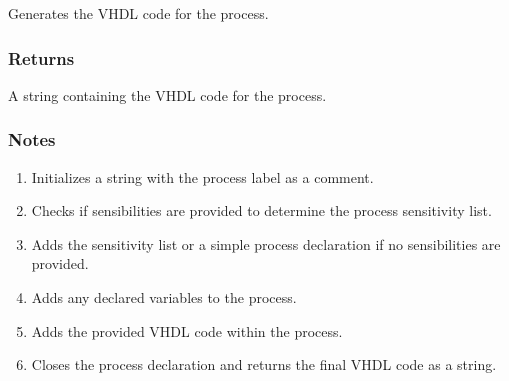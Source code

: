 \documentclass[letterpaper,10pt,english]{sphinxmanual}
\begin{document}
\begin{fulllineitems}
\begin{fulllineitems}
\label{\detokenize{process:process.Process.process_to_vhdl}}
\pysigstartsignatures
{}
\pysigstopsignatures
\sphinxAtStartPar
Generates the VHDL code for the process.


\subsubsection{Returns}
\label{\detokenize{process:id2}}\begin{description}
\sphinxAtStartPar
A string containing the VHDL code for the process.

\end{description}


\subsubsection{Notes}
\label{\detokenize{process:id3}}\begin{description}
\begin{enumerate}
%
\item {} 
\sphinxAtStartPar
Initializes a string  with the process label as a comment.

\item {} 
\sphinxAtStartPar
Checks if sensibilities are provided to determine the process sensitivity list.

\item {} 
\sphinxAtStartPar
Adds the sensitivity list or a simple process declaration if no sensibilities are provided.

\item {} 
\sphinxAtStartPar
Adds any declared variables to the process.

\item {} 
\sphinxAtStartPar
Adds the provided VHDL code within the process.

\item {} 
\sphinxAtStartPar
Closes the process declaration and returns the final VHDL code as a string.

\end{enumerate}

\end{description}

\end{fulllineitems}


\end{fulllineitems}
\end{document}
